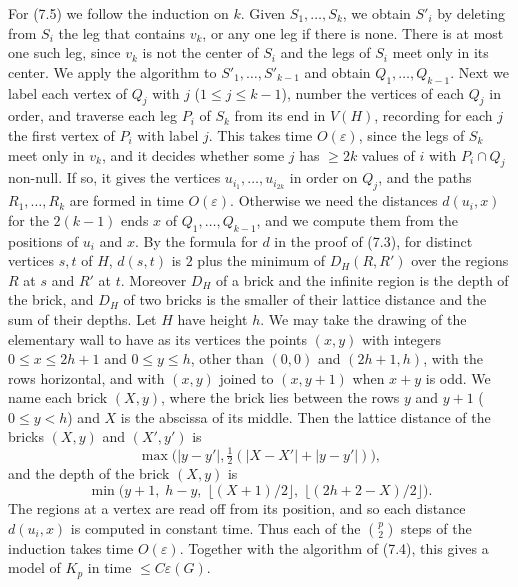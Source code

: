 {For (7.5) we follow the induction on $k$. Given $S_1, \dots, S_k$, we obtain $S'_i$ by deleting from $S_i$ the leg that contains $v_k$, or any one leg if there is none. There is at most one such leg, since $v_k$ is not the center of $S_i$ and the legs of $S_i$ meet only in its center. We apply the algorithm to $S'_1, \dots, S'_{k-1}$ and obtain $Q_1, \dots, Q_{k-1}$. Next we label each vertex of $Q_j$ with $j$ ($1 \le j \le k - 1$), number the vertices of each $Q_j$ in order, and traverse each leg $P_i$ of $S_k$ from its end in $V(H)$, recording for each $j$ the first vertex of $P_i$ with label $j$. This takes time $O(\varepsilon)$, since the legs of $S_k$ meet only in $v_k$, and it decides whether some $j$ has $\ge 2k$ values of $i$ with $P_i \cap Q_j$ non-null. If so, it gives the vertices $u_{i_1}, \dots, u_{i_{2k}}$ in order on $Q_j$, and the paths $R_1, \dots, R_k$ are formed in time $O(\varepsilon)$. Otherwise we need the distances $d(u_i, x)$ for the $2(k - 1)$ ends $x$ of $Q_1, \dots, Q_{k-1}$, and we compute them from the positions of $u_i$ and $x$. By the formula for $d$ in the proof of (7.3), for distinct vertices $s, t$ of $H$, $d(s, t)$ is $2$ plus the minimum of $D_H(R, R')$ over the regions $R$ at $s$ and $R'$ at $t$. Moreover $D_H$ of a brick and the infinite region is the depth of the brick, and $D_H$ of two bricks is the smaller of their lattice distance and the sum of their depths. Let $H$ have height $h$. We may take the drawing of the elementary wall to have as its vertices the points $(x, y)$ with integers $0 \le x \le 2h + 1$ and $0 \le y \le h$, other than $(0, 0)$ and $(2h + 1, h)$, with the rows horizontal, and with $(x, y)$ joined to $(x, y + 1)$ when $x + y$ is odd. We name each brick $(X, y)$, where the brick lies between the rows $y$ and $y + 1$ ($0 \le y < h$) and $X$ is the abscissa of its middle. Then the lattice distance of the bricks $(X, y)$ and $(X', y')$ is
\begin{equation*}
\max\bigl(|y - y'|, \tfrac{1}{2}(|X - X'| + |y - y'|)\bigr),
\end{equation*}
and the depth of the brick $(X, y)$ is
\begin{equation*}
\min\bigl(y + 1, \; h - y, \; \lfloor (X + 1)/2 \rfloor, \; \lfloor (2h + 2 - X)/2 \rfloor\bigr).
\end{equation*}
The regions at a vertex are read off from its position, and so each distance $d(u_i, x)$ is computed in constant time. Thus each of the $\binom{p}{2}$ steps of the induction takes time $O(\varepsilon)$. Together with the algorithm of (7.4), this gives a model of $K_p$ in time $\le C\varepsilon(G)$.}

